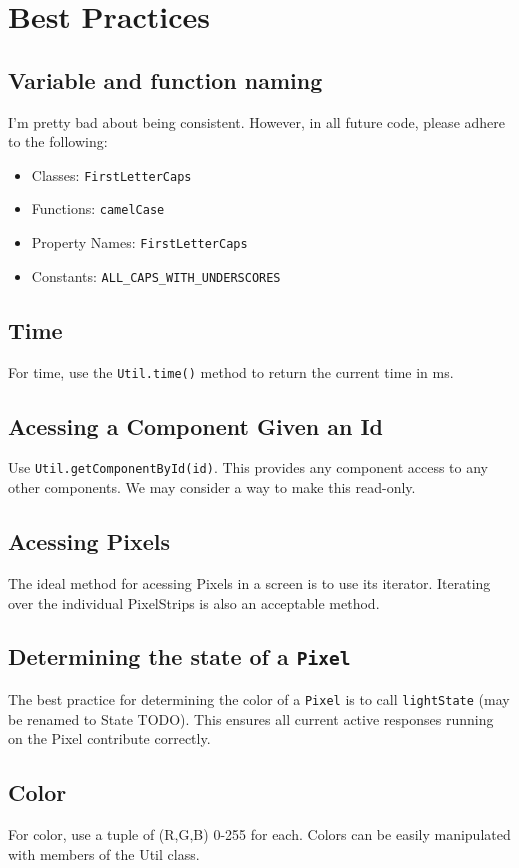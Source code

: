 \documentclass{article}
\begin{document}
    \section{Best Practices}
        \subsection{Variable and function naming}
            I'm pretty bad about being consistent.  However, in all future
            code, please adhere to the following:
            \begin{itemize}
                \item Classes: \texttt{FirstLetterCaps}
                \item Functions: \texttt{camelCase}
                \item Property Names: \texttt{FirstLetterCaps}
                \item Constants: \texttt{ALL\_CAPS\_WITH\_UNDERSCORES}
            \end{itemize}
        \subsection{Time}
            For time, use the \texttt{Util.time()} method to return the current
            time in ms.
        \subsection{Acessing a Component Given an Id}
            Use \texttt{Util.getComponentById(id)}.  This provides any
            component access to any other components.  We may consider a way to
            make this read-only.
        \subsection{Acessing Pixels}
            The ideal method for acessing Pixels in a screen is to use its
            iterator.  Iterating over the individual PixelStrips is also an
            acceptable method.  
        \subsection{Determining the state of a \texttt{Pixel}}
            The best practice for determining the color of a \texttt{Pixel} is to call
            \texttt{lightState} (may be renamed to State TODO).  This ensures
            all current active responses running on the Pixel contribute correctly. 
        \subsection{Color}
            For color, use a tuple of (R,G,B) 0-255 for each.  Colors can be
            easily manipulated with members of the Util class.
    
\end{document}
